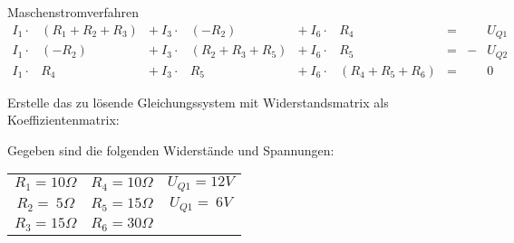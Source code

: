 
\begin{example}{Maschenstromverfahren}
    \[
        \begin{matrix}
            I_1 \cdot & (R_1 + R_2 + R_3) & + \ I_3 \cdot & (- R_2)           & + \ I_6 \cdot & R_4               & = &   & U_{Q1} \\
            I_1 \cdot & (- R_2)           & + \ I_3 \cdot & (R_2 + R_3 + R_5) & + \ I_6 \cdot & R_5               & = & - & U_{Q2} \\
            I_1 \cdot & R_4               & + \ I_3 \cdot & R_5               & + \ I_6 \cdot & (R_4 + R_5 + R_6) & = &   & 0
        \end{matrix}
    \]

    Erstelle das zu lösende Gleichungssystem mit Widerstandsmatrix als Koeffizientenmatrix:

    Gegeben sind die folgenden Widerstände und Spannungen:

    \begin{center}
        \begin{tabular}{ccc}
            $R_1 = 10\Omega$  & $R_4 = 10\Omega$ & $U_{Q1} = 12V$  \\
            $R_2 = \ 5\Omega$ & $R_5 = 15\Omega$ & $U_{Q1} = \ 6V$ \\
            $R_3 = 15\Omega$  & $R_6 = 30\Omega$ &
        \end{tabular}
    \end{center}


\end{example}
